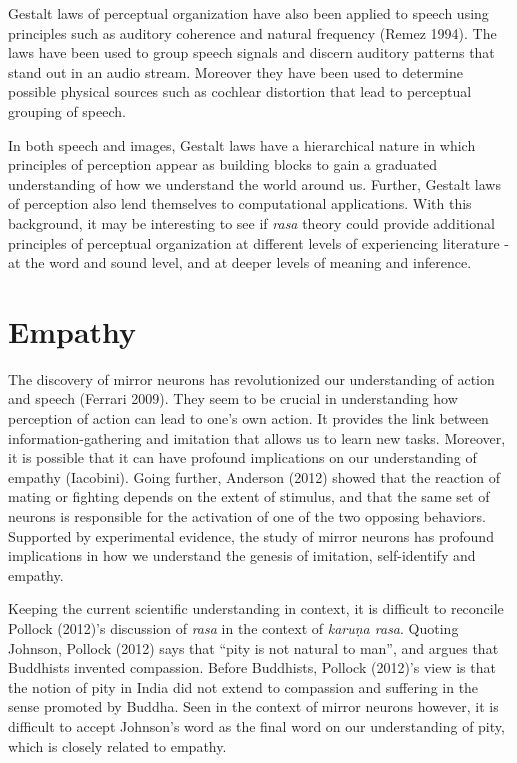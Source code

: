 Gestalt laws of perceptual organization have also been applied to speech using principles such as auditory coherence and natural frequency (Remez 1994). The laws have been used to group speech signals and discern auditory patterns that stand out in an audio stream. Moreover they have been used to determine possible physical sources such as cochlear distortion that lead to perceptual grouping of speech.

In both speech and images, Gestalt laws have a hierarchical nature in which principles of perception appear as building blocks to gain a graduated understanding of how we understand the world around us. Further, Gestalt laws of perception also lend themselves to computational applications. With this background, it may be interesting to see if \textsl{rasa} theory could provide additional principles of perceptual organization at different levels of experiencing literature - at the word and sound level, and at deeper levels of meaning and inference.\\[-20pt] 

\section*{Empathy}

The discovery of mirror neurons has revolutionized our understanding of action and speech (Ferrari 2009). They seem to be crucial in understanding how perception of action can lead to one’s own action. It provides the link between information-gathering and imitation that allows us to learn new tasks. Moreover, it is possible that it can have profound implications on our understanding of empathy (Iacobini). Going further, Anderson (2012) showed that the reaction of mating or fighting depends on the extent of stimulus, and that the same set of neurons is responsible for the activation of one of the two opposing behaviors. Supported by experimental evidence, the study of mirror neurons has profound implications in how we understand the genesis of imitation, self-identify and empathy. 

Keeping the current scientific understanding in context, it is difficult to reconcile Pollock (2012)’s discussion of \textsl{rasa} in the context of \textsl{karuṇa rasa}. Quoting Johnson, Pollock (2012) says that “pity is not natural to man”, and argues that Buddhists invented compassion. Before Buddhists, Pollock (2012)’s view is that the notion of pity in India did not extend to compassion and suffering in the sense promoted by Buddha. Seen in the context of mirror neurons however, it is difficult to accept Johnson’s word as the final word on our understanding of pity, which is closely related to empathy.

